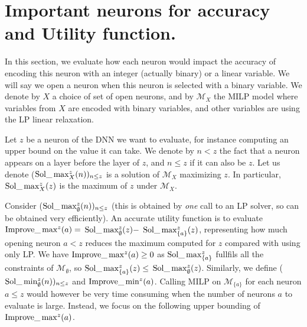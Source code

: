 \section{Important neurons for accuracy and Utility function.}

In this section, we evaluate how each neuron would impact the accuracy of encoding this neuron with an integer (actually binary) or a linear variable. We will say we open a neuron when this neuron is selected with a binary variable. We denote by $X$ a choice of set of open neurons, and by $\mathcal{M}_X$ the MILP model where variables from $X$ are encoded with binary variables, and other variables are using the LP linear relaxation.

Let $z$ be a neuron of the DNN we want to evaluate, for instance computing an upper bound on the value it can take. We denote by $n< z$ the fact that a neuron appears on a layer before the layer of $z$, and $n \leq z$ if it can also be $z$.
Let us denote ($\mathrm{Sol}\_\max_X^z(n))_{n \leq z}$ is a solution of $\mathcal{M}_X$ 
maximizing $z$. In particular, $\mathrm{Sol}\_\max_X^z(z)$ is the maximum of $z$ under $\mathcal{M}_X$.

Consider ($\mathrm{Sol}\_\max_\emptyset^z(n))_{n \leq z}$ (this is obtained by {\em one} call to an LP solver, so can be obtained very efficiently).
An accurate utility function is to evaluate 
$\mathrm{Improve}\_\max^z(a)=$ $\mathrm{Sol}\_\max_\emptyset^z(z) -$ $\mathrm{Sol}\_\max_{\{a\}}^z(z)$, 
representing how much opening neuron $a < z$ reduces the maximum computed for $z$
compared with using only LP. 
We have $\mathrm{Improve}\_\max^z(a)\geq 0$ as $\mathrm{Sol}\_\max_{\{a\}}^z$ fullfils all the constraints of 
$\mathcal{M}_\emptyset$, so $\mathrm{Sol}\_\max_{\{a\}}^z(z) \leq$ $\mathrm{Sol}\_\max_\emptyset^z(z)$.
Similarly, we define ($\mathrm{Sol}\_\min_\emptyset^z(n))_{n \leq z}$ and 
$\mathrm{Improve}\_\min^z(a)$. Calling MILP on $\mathcal{M}_{\{a\}}$ for each neuron $a \leq z$
would however be very time consuming when the number of neurons $a$ to evaluate is large.
Instead, we focus on the following upper bounding of $\mathrm{Improve}\_\max^z(a)$.








